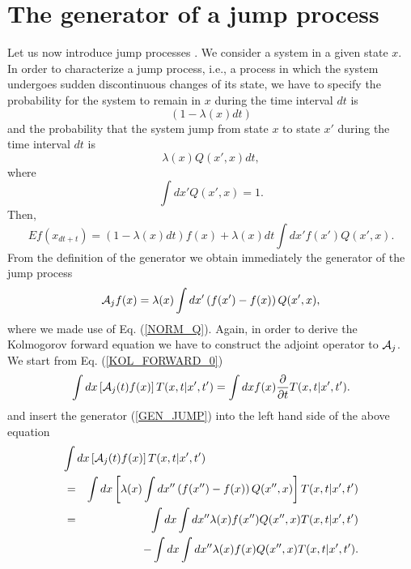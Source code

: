 \section{The generator of a jump process}
Let us now introduce jump processes \cite{DAVIES,KAPPLER}.
We consider a system in a given state $x$.  
In order to characterize a jump process, i.e., a process
in which the system undergoes sudden discontinuous changes of its state,
we have to specify the probability for 
the system to remain in $x$ during the time interval $dt$ is
\begin{equation*}
(1-\lambda(x) dt)
\end{equation*}
and the probability that the system jump from state $x$ to state
$x'$ during the time interval $dt$ is
\begin{equation*}
\lambda(x) Q(x',x) dt,
\end{equation*}
where
\begin{equation}
\label{NORM_Q}
\int dx' Q(x',x) =1.
\end{equation}
Then,
\begin{equation*}
Ef(x_{dt+t}) = (1-\lambda(x)dt) f(x)
   + \lambda(x) dt \int dx'f(x') Q(x',x).
\end{equation*}
From the definition of the generator we obtain immediately the
generator of the jump process
\begin{equation}
\label{GEN_JUMP}
{\cal{A}}_j f(x) = \lambda(x) \int dx' \left( f(x') 
-f(x)\right)Q(x',x),
\end{equation}
where we made use of Eq. (\ref{NORM_Q}).
Again, in order to derive the Kolmogorov forward equation we have 
to construct the adjoint operator to ${\cal{A}}_j$.
We start from Eq. (\ref{KOL_FORWARD_0})  
\begin{equation}
\label{KOL_FORWARD_J0}
\int dx \left[ {\cal{A}}_j(t) f(x) \right] T(x,t|x',t') =
  \int dx f(x) \frac{\partial}{\partial t} T(x,t|x',t').
\end{equation}
and insert the generator (\ref{GEN_JUMP}) into the left hand side 
of the above equation
\begin{eqnarray*}
\lefteqn{\int dx \left[ {\cal{A}}_j(t) f(x) \right] T(x,t|x',t')} 
\\
&=& \int dx \left[ \lambda(x)
       \int dx'' \left(f(x'') -f(x) \right) Q(x'',x) \right] T(x,t|x',t') 
       \\
& = & \int dx \int dx'' \lambda(x) f(x'') Q(x'',x) T(x,t|x',t') \\
& & - \int dx \int dx'' \lambda(x) f(x) Q(x'',x) T(x,t|x',t').
\end{eqnarray*}
